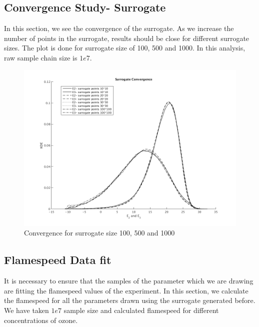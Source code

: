 \subsection{Convergence Study- Surrogate }

\noindent In this section, we see the convergence of the surrogate. As we increase the number of points in the surrogate, results should be close for different surrogate sizes. The plot is done for surrogate size of 100, 500 and 1000. In this analysis, raw sample chain size is $1e7$. 

\begin{figure}[H]
\centering
\includegraphics[scale=0.7]{model_2/surrogate_conv} 
    \caption{Convergence for surrogate size 100, 500 and 1000}
\end{figure}


\subsection{Flamespeed Data fit}

\noindent It is necessary to ensure that the samples of the parameter which we are drawing are fitting the flamespeed values of the experiment. In this section, we calculate the flamespeed for all the parameters drawn using the surrogate generated before. We have taken $1e7$ sample size and calculated flamespeed for different concentrations of ozone. 

